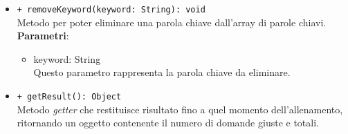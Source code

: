 \begin{itemize}
\begin{itemize}
				\item \texttt{+ removeKeyword(keyword: String): void} \\
				Metodo per poter eliminare una parola chiave dall'array di parole chiavi.\\
				\textbf{Parametri}:
				\begin{itemize}
					\item {keyword: String}\\
					Questo parametro rappresenta la parola chiave da eliminare.
				\end{itemize}
				
				\item \texttt{+ getResult(): Object} \\
				Metodo \textit{getter} che restituisce risultato fino a quel momento dell'allenamento, ritornando un oggetto contenente il numero di domande giuste e totali.
				
			\end{itemize}
		\end{itemize}
			
		